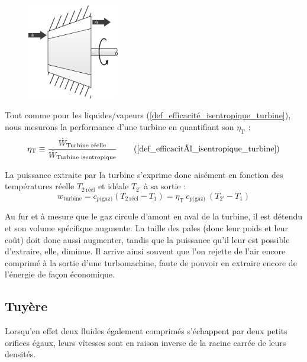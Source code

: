 		\begin{figure}
			\begin{center}
				\includegraphics[width=4cm]{images/symbole_turbine.png}
			\end{center}
			\label{fig_illustration_turbine2}
		\end{figure}

		Tout comme pour les liquides/vapeurs (\ref{def_efficacité_isentropique_turbine}), nous mesurons la performance d’une turbine en quantifiant son  $\eta_\text{T}$ :
		\begin{equation}
			\eta_\text{T} \equiv \frac{\dot W_\text{Turbine réelle}}{\dot W_\text{Turbine isentropique}}	  \tag{\ref{def_efficacité_isentropique_turbine}}
		\end{equation}

		La puissance extraite par la turbine s’exprime donc aisément en fonction des températures réelle $T_{2~\text{réel}}$ et idéale $T_{2’}$ à sa sortie :
		\begin{equation}
			w_\text{turbine} = c_{p \text{(gaz)}} (T_{2~\text{réel}} - T_1) =  \eta_\text{T} \ c_{p \text{(gaz)}} \ (T_{2’} - T_1)
			\label{eq_puissance_turbine_gaz}
		\end{equation}

		Au fur et à mesure que le gaz circule d’amont en aval de la turbine, il est détendu et son volume spécifique augmente. La taille des pales (donc leur poids et leur coût) doit donc aussi augmenter, tandis que la puissance qu’il leur est possible d’extraire, elle, diminue. Il arrive ainsi souvent que l’on rejette de l’air encore comprimé à la sortie d’une turbomachine, faute de pouvoir en extraire encore de l’énergie de façon économique.


	\subsection{Tuyère}

			Lorsqu’en effet deux fluides également comprimés s’échappent par deux petits orifices égaux, leurs vîtesses sont en raison inverse de la racine carrée de leurs \mbox{densités}.%

